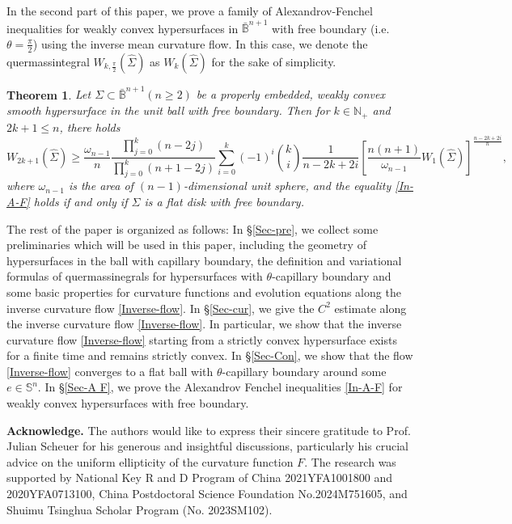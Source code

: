 \documentclass[11pt,reqno]{amsart}
\newtheorem{thm}{Theorem}[section]
\theoremstyle{definition}
\theoremstyle{remark}
\numberwithin{equation}{section}
\renewcommand{\(}{\left(}
\renewcommand{\)}{\right)}
\renewcommand{\-}{\overline}
\begin{document}
In the second part of this paper, we prove a family of Alexandrov-Fenchel inequalities for weakly convex hypersurfaces in $\bar{\mathbb{B}}^{n+1}$ with free boundary (i.e. $\theta=\frac{\pi}{2}$) using the inverse mean curvature flow. In this case, we denote the quermassintegral $W_{k,\frac{\pi}{2}}(\widehat{\Sigma})$ as $W_k(\widehat{\Sigma})$ for the sake of simplicity.

\begin{thm}\label{Thm-A F}
	Let $\Sigma\subset\bar{\mathbb{B}}^{n+1} (n\geq 2)$ be a properly embedded, weakly convex smooth hypersurface in the unit ball with free boundary. Then for $k\in\mathbb{N}_{+}$ and $2k+1\leq n$, there holds
	\begin{equation}\label{In-A-F}
		W_{2k+1}(\widehat{\Sigma})\geq\frac{\omega_{n-1}}{n}\frac{\prod_{j=0}^k(n-2j)}{\prod_{j=0}^k(n+1-2j)}\sum_{i=0}^k(-1)^i\binom{k}{i}\frac{1}{n-2k+2i}\left[\frac{n(n+1)}{\omega_{n-1}}W_1(\widehat{\Sigma})\right]^{\frac{n-2k+2i}{n}},
	\end{equation}
where $\omega_{n-1}$ is the area of $(n-1)$-dimensional unit sphere, and the equality \eqref{In-A-F} holds if and only if $\Sigma$ is a flat disk with free boundary.
\end{thm}
The rest of the paper is organized as follows: In \S\ref{Sec-pre}, we collect some preliminaries which will be used in this paper, including the geometry of hypersurfaces in the ball with capillary boundary, the definition and variational formulas of quermassinegrals for hypersurfaces with $\theta$-capillary boundary and some basic properties for curvature functions and evolution equations along the inverse curvature flow \eqref{Inverse-flow}. In \S\ref{Sec-cur}, we give the $C^2$ estimate along the inverse curvature flow \eqref{Inverse-flow}. In particular, we show that the inverse curvature flow \eqref{Inverse-flow} starting from a strictly convex hypersurface exists for a finite time and remains strictly convex. In \S\ref{Sec-Con}, we show that the flow \eqref{Inverse-flow} converges to a flat ball with $\theta$-capillary boundary around some $e\in\mathbb{S}^n$. In \S\ref{Sec-A F}, we prove the Alexandrov Fenchel inequalities \eqref{In-A-F} for weakly convex hypersurfaces with free boundary.

\textbf{Acknowledge.} The authors would like to express their sincere gratitude to  Prof. Julian Scheuer  for his generous and insightful discussions, particularly his crucial advice on the uniform ellipticity of the curvature function $F$.  The research was supported by National Key R and D Program of China 2021YFA1001800 and 2020YFA0713100, China Postdoctoral Science Foundation No.2024M751605, and Shuimu Tsinghua Scholar Program (No. 2023SM102).
 
\end{document}
